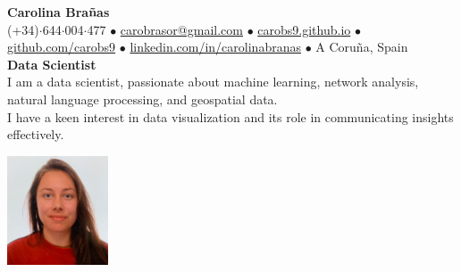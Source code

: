\documentclass{resume}
\begin{document}
\vspace{-2em}
\begin{minipage}{0.75\textwidth}
    \raggedright
    {\Huge \textbf{Carolina Brañas}}\\[0.5em] 
    {\small
    (+34)$\cdot$644$\cdot$004$\cdot$477 $\bullet$ 
    \href{mailto://carobrasor@gmail.com}{carobrasor@gmail.com} $\bullet$ 
    \href{https://carobs9.github.io/}{carobs9.github.io} $\bullet$ 
    \href{https://github.com/carobs9}{github.com/carobs9} $\bullet$ 
    \href{https://www.linkedin.com/in/carolinabranas/}{linkedin.com/in/carolinabranas} $\bullet$ 
    A Coruña, Spain
    }\\[1em]
    {\normalsize \textbf{Data Scientist}}\\[0.5em]
    I am a data scientist, passionate about machine learning, network analysis, natural language processing, and geospatial data. \\
    I have a keen interest in data visualization and its role in communicating insights effectively.
\end{minipage}%
\hfill
\begin{minipage}{0.23\textwidth}
    \begin{flushright}
        \includegraphics[width=3cm]{profile.jpg}
    \end{flushright}
\end{minipage}
\vspace{1em}

\end{document}
